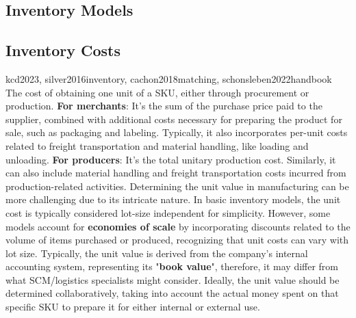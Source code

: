 \documentclass{jorbnc_cheatsheet}
\begin{document}
\begin{multicols*}{4}

\subsection{Inventory Models}



\subsection{Inventory Costs}

{kcd2023, silver2016inventory, cachon2018matching, schonsleben2022handbook}{
The cost of obtaining one unit of a SKU, either through procurement or production.
\breakspace
\textbf{For merchants}:
It's the sum of the purchase price paid to the supplier, combined with additional costs necessary 
for preparing the product for sale, such as packaging and labeling. Typically, it also incorporates 
per-unit costs related to freight transportation and material handling, like loading and unloading.
\breakspace
\textbf{For producers}:
It's the total unitary production cost. Similarly, it can also include material handling and freight
transportation costs incurred from production-related activities.
Determining the unit value in manufacturing can be more challenging  due to its intricate nature.
\breakspace
In basic inventory models, the unit cost is typically considered lot-size independent for simplicity.
However, some models account for \textbf{economies of scale} by incorporating discounts related to the volume of 
items purchased or produced, recognizing that unit costs can vary with lot size.
\breakspace
Typically, the unit value is derived from the company's internal accounting system, representing its
"\textbf{book value}", therefore, it may differ from what SCM/logistics specialists might consider. 
Ideally, the unit value should be determined collaboratively, taking into account the actual money 
spent on that specific SKU to prepare it for either internal or external use.
}




\end{multicols*}
\end{document}

